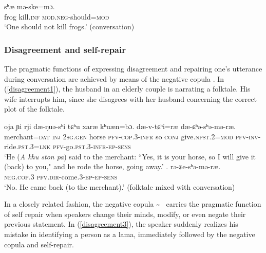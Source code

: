 \documentclass[output=paper,colorlinks,citecolor=brown]{langscibook}
\begin{document}
\ea
\label{should.not}
 		{sʰæ}		{mə-ske=mɔ}.\\ 
      frog kill.\textsc{inf}    \textsc{mod.neg}-should=\textsc{mod}\\ 
\glt `One should not kill frogs.' (conversation)
\z

\z

\subsubsection{Disagreement and self-repair}
    The pragmatic functions of expressing disagreement and repairing one's utterance during conversation are achieved by means of the negative copula . In (\ref{disagreement1}), the husband in an elderly couple is narrating a folktale. His wife interrupts him, since she disagrees with her husband concerning the correct plot of the folktale.

\ea 
    \begin{xlist}
    \label{disagreement1}
        		{oja}		{ɲi} 		{rji}			{dæ-ŋuə-sʰi}		{tɕʰu}    {xaræ} {kʰuæn=bɔ}.		{dæ-v-tɕʰi=ræ}		{dæ-ɕʰə-sʰə-mə-ræ}.\\
        merchant=\textsc{dat}		\textsc{inj}	\textsc{2sg.gen}	horse		\textsc{pfv-cop}.3-\textsc{infr}		so			\textsc{conj} 	give.\textsc{npst}.2=\textsc{mod}	\textsc{pfv-inv}-ride.\textsc{pst}.3=\textsc{lnk}		\textsc{pfv}-go.\textsc{pst}.3-\textsc{infr-ep-sens}\\
        \glt `He (\textit{A khu ston pa}) said to the merchant: ``Yes, it is your horse, so I will give it (back) to you," and he rode the horse, going away.'    
    \label{disagreement2}
        . 		{rə-ʑe-sʰə-mə-ræ}.\\
        \textsc{neg.cop}.3	\textsc{pfv.dir}-come.3-\textsc{ep-ep-sens}\\
        \glt `No. He came back (to the merchant).' (folktale mixed with conversation)
    \end{xlist}
\z

In a closely related fashion, the negative copula  \textasciitilde \   carries the pragmatic function of self repair when speakers change their minds, modify, or even negate their previous statement. In (\ref{disagreement3}), the speaker suddenly realizes his mistake in identifying a person as a lama, immediately followed by the negative copula and self-repair.
\end{document}

